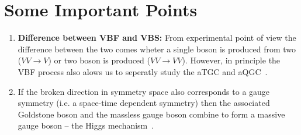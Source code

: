 \chapter{Some Important Points} %
\label{cha:some_important_points}

\begin{enumerate}
	\item \textbf{Difference between VBF and VBS:} From experimental point of view the difference between the two comes wheter a single boson is produced from two ($VV\rightarrow V$) or two boson is produced ($VV \rightarrow VV$). However, in principle the VBF process also alows us to seperatly study the aTGC and aQGC~\cite{Green2017}.
	\item If the broken direction in symmetry space also corresponds to a gauge symmetry (i.e. a space-time dependent symmetry) then the associated Goldstone boson and the massless gauge boson combine to form a massive gauge boson -- the Higgs mechanism~\cite{Chanowitz1988}.
\end{enumerate}
